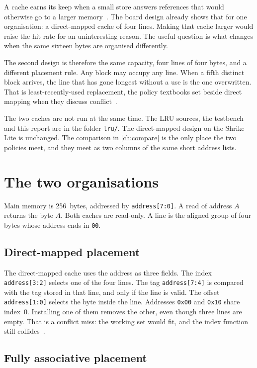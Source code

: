 \documentclass[a4paper,11pt,oneside,headings=small,parskip=half,titlepage=false]{scrreprt}
\begin{document}
A cache earns its keep when a small store answers references that would otherwise go to a larger memory~\cite{hennessy2017,patterson2021}. The board design already shows that for one organisation: a direct-mapped cache of four lines. Making that cache larger would raise the hit rate for an uninteresting reason. The useful question is what changes when the same sixteen bytes are organised differently.

The second design is therefore the same capacity, four lines of four bytes, and a different placement rule. Any block may occupy any line. When a fifth distinct block arrives, the line that has gone longest without a use is the one overwritten. That is least-recently-used replacement, the policy textbooks set beside direct mapping when they discuss conflict~\cite{hill1989,patterson2021}.

The two caches are not run at the same time. The LRU sources, the testbench and this report are in the folder \texttt{lru/}. The direct-mapped design on the Shrike Lite is unchanged. The comparison in \cref{ch:compare} is the only place the two policies meet, and they meet as two columns of the same short address lists.

\chapter{The two organisations}
\label{ch:org}

Main memory is 256~bytes, addressed by \texttt{address[7:0]}. A read of address \(A\) returns the byte \(A\). Both caches are read-only. A line is the aligned group of four bytes whose address ends in \texttt{00}.

\section{Direct-mapped placement}

The direct-mapped cache uses the address as three fields. The index \texttt{address[3:2]} selects one of the four lines. The tag \texttt{address[7:4]} is compared with the tag stored in that line, and only if the line is valid. The offset \texttt{address[1:0]} selects the byte inside the line. Addresses \texttt{0x00} and \texttt{0x10} share index~0. Installing one of them removes the other, even though three lines are empty. That is a conflict miss: the working set would fit, and the index function still collides~\cite{hill1989}.

\section{Fully associative placement}
\end{document}
